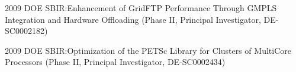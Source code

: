 \begin{itemize}
 	    2009 DOE SBIR:Enhancement of GridFTP Performance Through
 	    GMPLS Integration and Hardware Offloading (Phase II, Principal
 	    Investigator, DE-SC0002182)
 	
 	2009 DOE SBIR:Optimization of the PETSc Library for
 		Clusters of MultiCore Processors (Phase II, Principal
 		Investigator, DE-SC0002434)
 	
 	
 	
 	
 	
 	

\end{itemize}
